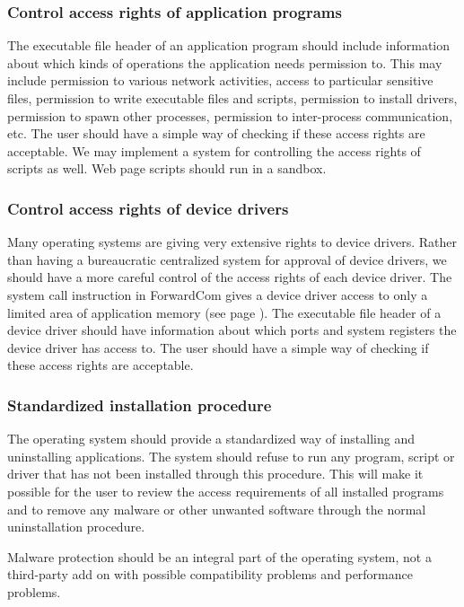 \documentclass[forwardcom.tex]{subfiles}
\begin{document}
\subsubsection{Control access rights of application programs} 
The executable file header of an application program should include information about which kinds of operations the application needs permission to. This may include permission to various network activities, access to particular sensitive files, permission to write executable files and scripts, permission to install drivers, permission to spawn other processes, permission to inter-process communication, etc. The user should have a simple way of checking if these access rights are acceptable. We may implement a system for controlling the access rights of scripts as well. Web page scripts should run in a sandbox.

\subsubsection{Control access rights of device drivers} 
Many operating systems are giving very extensive rights to device drivers. Rather than having a bureaucratic centralized system for approval of device drivers, we should have a more careful control of the access rights of each device driver. The system call instruction in ForwardCom gives a device driver access to only a limited area of application memory (see page \pageref{systemCallInstruction}). The executable file header of a device driver should have information about which ports and system registers the device driver has access to. The user should have a simple way of checking if these access rights are acceptable.

\subsubsection{Standardized installation procedure} 
The operating system should provide a standardized way of installing and uninstalling applications. The system should refuse to run any program, script or driver that has not been installed through this procedure. This will make it possible for the user to review the access requirements of all installed programs and to remove any malware or other unwanted software through the normal uninstallation procedure.
\vv

Malware protection should be an integral part of the operating system, not a third-party add on with possible compatibility problems and performance problems. 
\end{document}

